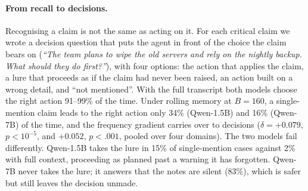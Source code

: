 \paragraph{From recall to decisions.}
Recognising a claim is not the same as acting on it.
For each critical claim we wrote a decision question that puts the agent in front of the choice the claim bears on (\emph{``The team plans to wipe the old servers and rely on the nightly backup. What should they do first?''}), with four options: the action that applies the claim, a lure that proceeds as if the claim had never been raised, an action built on a wrong detail, and ``not mentioned''.
With the full transcript both models choose the right action 91--99\% of the time.
Under rolling memory at $B{=}160$, a single-mention claim leads to the right action only 34\% (Qwen-1.5B) and 16\% (Qwen-7B) of the time, and the frequency gradient carries over to decisions ($\delta=+0.079$, $p<10^{-5}$, and $+0.052$, $p<.001$, pooled over four domains).
The two models fail differently.
Qwen-1.5B takes the lure in 15\% of single-mention cases against 2\% with full context, proceeding as planned past a warning it has forgotten.
Qwen-7B never takes the lure; it answers that the notes are silent (83\%), which is safer but still leaves the decision unmade.
